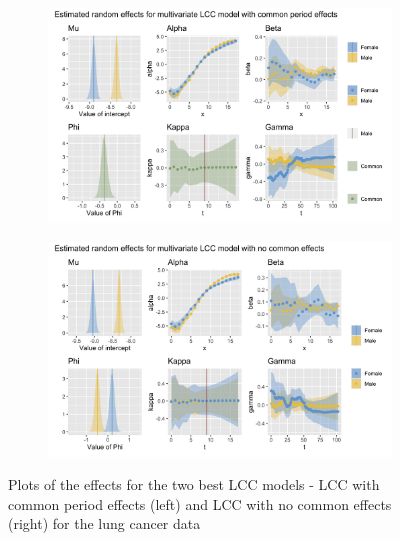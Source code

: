 \begin{figure}[h!]
    \centering
    \begin{subfigure}[b]{.45\linewidth}
        \includegraphics[width=\linewidth]{real-data/real-data-multivariate/Figures/effects-LCC-common-period-stomach.png}
    \end{subfigure}
    \begin{subfigure}[b]{.45\linewidth}
        \includegraphics[width=\linewidth]{real-data/real-data-multivariate/Figures/effects-LCC-no-common-stomach.png}
    \end{subfigure}
    \caption{Plots of the effects for the two best LCC models - LCC with common period effects (left) and LCC with no common effects (right) for the lung cancer data}
    \label{fig:effects-LCC-stomach}
\end{figure}

